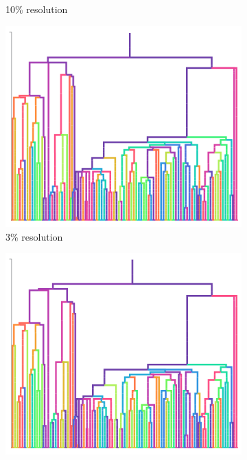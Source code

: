 \begin{figure}
\begin{subfigure}[b]{\linewidth}
    \caption{%
      10\% resolution}
    \label{fig:plain-perfect-and-reconstruction-phylogenies:resolution_10}
  \end{subfigure}
  \begin{subfigure}[b]{\linewidth}
    \centering
    \includegraphics[width=\textwidth, height=0.16\textheight]{img/plain_resolution_30}
    \caption{%
      3\% resolution}
    \label{fig:plain-perfect-and-reconstruction-phylogenies:resolution_30}
  \end{subfigure}
  \begin{subfigure}[b]{\linewidth}
    \centering
    \includegraphics[width=\textwidth, height=0.16\textheight]{img/plain_resolution_100}

\end{subfigure}
\end{figure}
